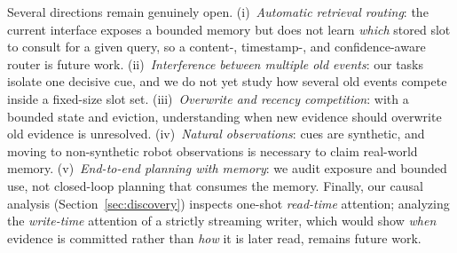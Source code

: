 Several directions remain genuinely open.  (i)~\emph{Automatic retrieval
routing}: the current interface exposes a bounded memory but does not learn
\emph{which} stored slot to consult for a given query, so a content-,
timestamp-, and confidence-aware router is future work.  (ii)~\emph{Interference
between multiple old events}: our tasks isolate one decisive cue, and we do not
yet study how several old events compete inside a fixed-size slot set.
(iii)~\emph{Overwrite and recency competition}: with a bounded state and
eviction, understanding when new evidence should overwrite old evidence is
unresolved.  (iv)~\emph{Natural observations}: cues are synthetic, and moving to
non-synthetic robot observations is necessary to claim real-world memory.
(v)~\emph{End-to-end planning with memory}: we audit exposure and bounded use,
not closed-loop planning that consumes the memory.  Finally, our causal analysis
(Section~\ref{sec:discovery}) inspects one-shot \emph{read-time} attention;
analyzing the \emph{write-time} attention of a strictly streaming writer, which
would show \emph{when} evidence is committed rather than \emph{how} it is later
read, remains future work.
